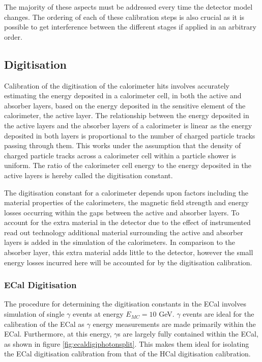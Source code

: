 The majority of these aspects must be addressed every time the detector model changes.  The ordering of each of these calibration steps is also crucial as it is possible to get interference between the different stages if applied in an arbitrary order.


\subsection{Digitisation}
\label{sec:digi}
Calibration of the digitisation of the calorimeter hits involves accurately estimating the energy deposited in a calorimeter cell, in both the active and absorber layers, based on the energy deposited in the sensitive element of the calorimeter, the active layer.  The relationship between the energy deposited in the active layers and the absorber layers of a calorimeter is linear as the energy deposited in both layers is proportional to the number of charged particle tracks passing through them.  This works under the assumption that the density of charged particle tracks across a calorimeter cell within a particle shower is uniform.  The ratio of the calorimeter cell energy to the energy deposited in the active layers is hereby called the digitisation constant.

The digitisation constant for a calorimeter depends upon factors including the material properties of the calorimeters, the magnetic field strength and energy losses occurring within the gaps between the active and absorber layers.  To account for the extra material in the detector due to the effect of instrumented read out technology additional material surrounding the active and absorber layers is added in the simulation of the calorimeters.  In comparison to the absorber layer, this extra material adds little to the detector, however the small energy losses incurred here will be accounted for by the digitisation calibration.  


\subsubsection{ECal Digitisation}
\label{sec:ecaldigi}
The procedure for determining the digitisation constants in the ECal involves simulation of single $\gamma$ events at energy $E_{MC} = 10$ GeV.  $\gamma$ events are ideal for the calibration of the ECal as $\gamma$ energy measurements are made primarily within the ECal.  Furthermore, at this energy, $\gamma$s are largely fully contained within the ECal, as shown in figure \ref{fig:ecaldigiphotonsplit}.  This makes them ideal for isolating the ECal digitisation calibration from that of the HCal digitisation calibration.   

